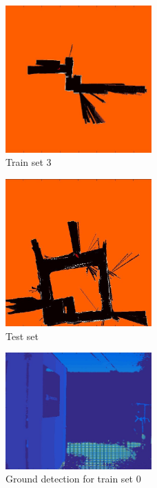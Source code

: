 \documentclass[letterpaper,twocolumn,10pt]{article}
\begin{document}
\begin{figure}[h]
    \centering
    \includegraphics[width=0.5\textwidth]{results/train3.jpg}
    \caption{Train set 3}
    \label{fig:train3}
\end{figure}
\begin{figure}[h]
    \centering
    \includegraphics[width=0.5\textwidth]{results/test.jpg}
    \caption{Test set}
    \label{fig:test}
\end{figure}
\begin{figure}[h]
    \centering
    \includegraphics[width=0.5\textwidth]{results/train0_ground_d.jpg}
    \caption{Ground detection for train set 0}
    \label{fig:ground0}
\end{figure}
\end{document}
